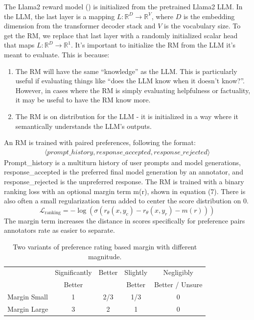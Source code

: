 \documentclass[
  letterpaper,
  DIV=11,
  numbers=noendperiod,
  oneside]{scrreprt}
\theoremstyle{remark}
\begin{document}
The Llama2 reward model () is
initialized from the pretrained Llama2 LLM. In the LLM, the last layer
is a mapping \(L: \mathbb{R}^D \rightarrow \mathbb{R}^V\), where \(D\)
is the embedding dimension from the transformer decoder stack and \(V\)
is the vocabulary size. To get the RM, we replace that last layer with a
randomly initialized scalar head that maps
\(L: \mathbb{R}^D \rightarrow \mathbb{R}^1\). It's important to
initialize the RM from the LLM it's meant to evaluate. This is because:

\begin{enumerate}
\def\labelenumi{\arabic{enumi}.}
\item
  The RM will have the same ``knowledge'' as the LLM. This is
  particularly useful if evaluating things like ``does the LLM know when
  it doesn't know?''. However, in cases where the RM is simply
  evaluating helpfulness or factuality, it may be useful to have the RM
  know more.
\item
  The RM is on distribution for the LLM - it is initialized in a way
  where it semantically understands the LLM's outputs.
\end{enumerate}

An RM is trained with paired preferences, following the format:
\[\begin{aligned}
    \langle prompt\_history, response\_accepted, response\_rejected \rangle
\end{aligned}\] Prompt\_history is a multiturn history of user prompts
and model generations, response\_accepted is the preferred final model
generation by an annotator, and response\_rejected is the unpreferred
response. The RM is trained with a binary ranking loss with an optional
margin term m(r), shown in equation (7). There is also often a small
regularization term added to center the score distribution on 0.
\[\mathcal{L}_{\text{ranking}} = -\log(\sigma(r_\theta(x,y_c) - r_\theta(x,y_r) - m(r)))\]
The margin term increases the distance in scores specifically for
preference pairs annotators rate as easier to separate.

\label{tab:margin_nums}
\begin{longtable}[]{@{}lcccc@{}}
\caption{Two variants of preference rating based margin with different
magnitude.}\tabularnewline
\toprule\noalign{}
\endfirsthead
\endhead
\bottomrule\noalign{}
\endlastfoot
& Significantly & Better & Slightly & Negligibly \\
& Better & & Better & Better / Unsure \\
Margin Small & 1 & 2/3 & 1/3 & 0 \\
Margin Large & 3 & 2 & 1 & 0 \\
\end{longtable}
\end{document}
